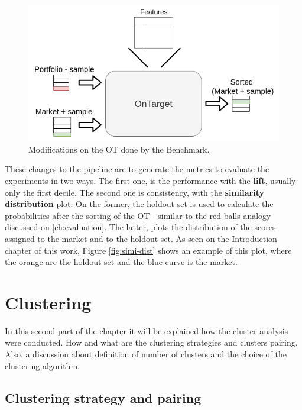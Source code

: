 \begin{figure}[h]
   \centering
   \includegraphics[width=\linewidth]{fig/ch3-ot-benchmark-blocks.png}
   \caption{Modifications on the OT done by the Benchmark.}
   \label{fig:ot-benchmark-blocks}
\end{figure}

These changes to the pipeline are to generate the metrics to evaluate the experiments in two ways. The first one, is the performance with the \textbf{lift}, usually only the first decile. The second one is consistency, with the \textbf{similarity distribution} plot. On the former, the holdout set is used to calculate the probabilities after the sorting of the OT - similar to the red balls analogy discussed on \ref{ch:evaluation}. The latter, plots the distribution of the scores assigned to the market and to the holdout set. As seen on the Introduction chapter of this work, Figure \ref{fig:simi-dist} shows an example of this plot, where the orange are the holdout set and the blue curve is the market.

\section{Clustering}

In this second part of the chapter it will be explained how the cluster analysis were conducted. How and what are the clustering strategies and clusters pairing. Also, a discussion about definition of number of clusters and the choice of the clustering algorithm.

\subsection{Clustering strategy and pairing}

\newcommand{\fullNameClusterStrategyA}{Train on Portfolio}
\newcommand{\nameClusterStrategyA}{ToP}
\newcommand{\fullNameClusterStrategyB}{Train on All}
\newcommand{\nameClusterStrategyB}{ToA}
\newcommand{\fullNameClusterPairingA}{One versus One}
\newcommand{\nameClusterPairingA}{OvO}
\newcommand{\fullNameClusterPairingB}{One versus All}
\newcommand{\nameClusterPairingB}{OvA}


